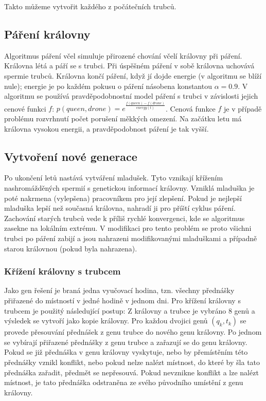 \documentclass[12pt, a4paper]{article}
\begin{document}
Takto můžeme vytvořit každého z počátečních trubců.
\subsection{Páření královny}
Algoritmus páření včel simuluje přirozené chování včelí královny při páření.
Královna létá a páří se s trubci. Při úspěšném páření v sobě královna uchovává spermie trubců.
Královna končí páření, když jí dojde energie (v algoritmu se blíží nule); energie je po každém pokusu o páření násobena konstantou $\alpha = 0.9$.
V algoritmu se používá pravděpodobnostní model páření s trubci v závislosti jejich cenové funkci $f$: $p(queen, drone) = e^{\frac{f(queen) - f(drone)}{energy(t)}}$.
Cenová funkce $f$ je v případě problému rozvrhnutí počet porušení měkkých omezení. Na začátku letu má královna vysokou energii, a pravděpodobnost páření je tak vyšší.

\subsection{Vytvoření nové generace}
Po ukončení letů nastává vytváření mladušek. Tyto vznikají křížením nashromážděných spermií s genetickou informací královny.
Vzniklá mladuška je poté nakrmena (vylepšena) pracovníkem pro její zlepšení. Pokud je nejlepší mladuška lepší než současná královna, nahradí ji pro příští cyklus páření.
Zachování starých trubců vede k příliš rychlé konvergenci, kde se algoritmus zasekne na lokálním extrému.
V modifikaci pro tento problém se proto všichni trubci po páření zabijí a jsou nahrazeni modifikovanými mladuškami a případně starou královnou (pokud byla nahrazena).

\subsubsection{Křížení královny s trubcem}
Jako gen řešení je braná jedna vyučovací hodina, tzn. všechny přednášky přiřazené do místností v jedné hodině v jednom dni.
Pro křížení královny s trubcem je použitý následující postup:
Z královny a trubce je vybráno 8 genů a výsledek se vytvoří jako kopie královny.
Pro každou dvojici genů $(q_k, t_k)$ se provede přesouvání přednášek z genu trubce do nového genu královny.
Po jednom se vybírají přiřazené přednášky z genu trubce a zařazují se do genu královny.
Pokud se již přednáška v genu královny vyskytuje, nebo by přemístěním této přednášky vznikl konflikt, nebo pokud nelze nalézt místnost, do které by šla tato přednáška zařadit,
předmět se nepřesouvá. Pokud nevznikne konflikt a lze nalézt místnost, je tato přednáška odstraněna ze svého původního umístění z genu královny.
\end{document}
